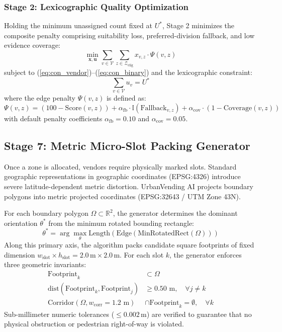 \subsubsection{Stage 2: Lexicographic Quality Optimization}
Holding the minimum unassigned count fixed at $U^*$, Stage 2 minimizes the composite penalty comprising suitability loss, preferred-division fallback, and low evidence coverage:
\begin{equation}
    \min_{\mathbf{x}, \mathbf{u}} \sum_{v \in \mathcal{V}} \sum_{z \in \mathcal{Z}_{\text{elig}}} x_{v,z} \cdot \Psi(v, z)
    \label{eq:milp_stage2}
\end{equation}
subject to (\ref{eq:con_vendor})--(\ref{eq:con_binary}) and the lexicographic constraint:
\begin{equation}
    \sum_{v \in \mathcal{V}} u_v = U^*
    \label{eq:con_lexicographic}
\end{equation}
where the edge penalty $\Psi(v, z)$ is defined as:
\begin{equation}
    \Psi(v, z) = (100 - \text{Score}(v, z)) + \alpha_{\text{fb}} \cdot \mathbb{I}(\text{Fallback}_{v,z}) + \alpha_{\text{cov}} \cdot (1 - \text{Coverage}(v, z))
    \label{eq:penalty}
\end{equation}
with default penalty coefficients $\alpha_{\text{fb}} = 0.10$ and $\alpha_{\text{cov}} = 0.05$.

\subsection{Stage 7: Metric Micro-Slot Packing Generator}
\label{sec:meth_stage7}

Once a zone is allocated, vendors require physically marked slots. Standard geographic representations in geographic coordinates (EPSG:4326) introduce severe latitude-dependent metric distortion. UrbanVending AI projects boundary polygons into metric projected coordinates (EPSG:32643 / UTM Zone 43N).

For each boundary polygon $\Omega \subset \mathbb{R}^2$, the generator determines the dominant orientation $\theta^*$ from the minimum rotated bounding rectangle:
\begin{equation}
    \theta^* = \arg\max_{\theta} \text{Length}(\text{Edge}(\text{MinRotatedRect}(\Omega)))
    \label{eq:orientation}
\end{equation}
Along this primary axis, the algorithm packs candidate square footprints of fixed dimension $w_{\text{slot}} \times h_{\text{slot}} = 2.0\,\text{m} \times 2.0\,\text{m}$. For each slot $k$, the generator enforces three geometric invariants:
\begin{align}
    \text{Footprint}_k &\subset \Omega \label{eq:geom_contain} \\
    \text{dist}(\text{Footprint}_k, \text{Footprint}_j) &\ge 0.50\text{ m}, \quad \forall j \ne k \label{eq:geom_spacing} \\
    \text{Corridor}(\Omega, w_{\text{corr}} = 1.2\text{ m}) &\cap \text{Footprint}_k = \emptyset, \quad \forall k \label{eq:geom_corridor}
\end{align}
Sub-millimeter numeric tolerances ($\le 0.002\,\text{m}$) are verified to guarantee that no physical obstruction or pedestrian right-of-way is violated.

